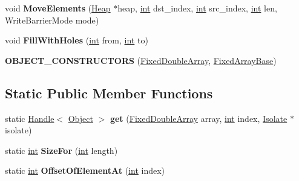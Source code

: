 \begin{DoxyCompactItemize}
\item 
\mbox{\label{classv8_1_1internal_1_1FixedDoubleArray_a24889ebe881e2868b46c35b47e2689a9}} 
void {\bfseries Move\+Elements} (\mbox{\hyperlink{classv8_1_1internal_1_1Heap}{Heap}} $\ast$heap, \mbox{\hyperlink{classint}{int}} dst\+\_\+index, \mbox{\hyperlink{classint}{int}} src\+\_\+index, \mbox{\hyperlink{classint}{int}} len, Write\+Barrier\+Mode mode)
\item 
\mbox{\label{classv8_1_1internal_1_1FixedDoubleArray_aec3fa54db75885b5d2ce535add8d8193}} 
void {\bfseries Fill\+With\+Holes} (\mbox{\hyperlink{classint}{int}} from, \mbox{\hyperlink{classint}{int}} to)
\item 
\mbox{\label{classv8_1_1internal_1_1FixedDoubleArray_a6c800ee49e8eee0d8522ae7d0c7fd13d}} 
{\bfseries O\+B\+J\+E\+C\+T\+\_\+\+C\+O\+N\+S\+T\+R\+U\+C\+T\+O\+RS} (\mbox{\hyperlink{classv8_1_1internal_1_1FixedDoubleArray}{Fixed\+Double\+Array}}, \mbox{\hyperlink{classv8_1_1internal_1_1FixedArrayBase}{Fixed\+Array\+Base}})
\end{DoxyCompactItemize}
\subsection*{Static Public Member Functions}
\begin{DoxyCompactItemize}
\item 
\mbox{\label{classv8_1_1internal_1_1FixedDoubleArray_aa306a025362f59cd79aa4c951697a7f5}} 
static \mbox{\hyperlink{classv8_1_1internal_1_1Handle}{Handle}}$<$ \mbox{\hyperlink{classv8_1_1internal_1_1Object}{Object}} $>$ {\bfseries get} (\mbox{\hyperlink{classv8_1_1internal_1_1FixedDoubleArray}{Fixed\+Double\+Array}} array, \mbox{\hyperlink{classint}{int}} index, \mbox{\hyperlink{classv8_1_1internal_1_1Isolate}{Isolate}} $\ast$isolate)
\item 
\mbox{\label{classv8_1_1internal_1_1FixedDoubleArray_ad43d5cfebc4805de874b189cf2c94055}} 
static \mbox{\hyperlink{classint}{int}} {\bfseries Size\+For} (\mbox{\hyperlink{classint}{int}} length)
\item 
\mbox{\label{classv8_1_1internal_1_1FixedDoubleArray_aea74d64b36ea2275796e59287e418316}} 
static \mbox{\hyperlink{classint}{int}} {\bfseries Offset\+Of\+Element\+At} (\mbox{\hyperlink{classint}{int}} index)
\end{DoxyCompactItemize}
